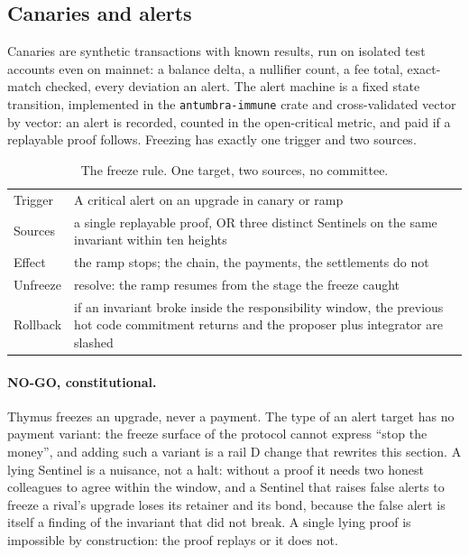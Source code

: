 \subsection{Canaries and alerts}

Canaries are synthetic transactions with known results, run on
isolated test accounts even on mainnet: a balance delta, a
nullifier count, a fee total, exact-match checked, every
deviation an alert. The alert machine is a fixed state transition,
implemented in the \texttt{antumbra-immune} crate and
cross-validated vector by vector: an alert is recorded, counted
in the open-critical metric, and paid if a replayable proof
follows. Freezing has exactly one trigger and two sources.

\begin{table}[htbp]
\centering
\small
\caption{The freeze rule. One target, two sources, no committee.}
\label{tab:freeze}
\begin{tabularx}{\textwidth}{@{}L{4.6cm}Y@{}}
\toprule
Trigger & A critical alert on an upgrade in canary or ramp \\
Sources & a single replayable proof, OR three distinct Sentinels on the same invariant within ten heights \\
Effect & the ramp stops; the chain, the payments, the settlements do not \\
Unfreeze & resolve: the ramp resumes from the stage the freeze caught \\
Rollback & if an invariant broke inside the responsibility window, the previous hot code commitment returns and the proposer plus integrator are slashed \\
\bottomrule
\end{tabularx}
\end{table}

\paragraph{NO-GO, constitutional.} Thymus freezes an upgrade,
never a payment. The type of an alert target has no payment
variant: the freeze surface of the protocol cannot express
``stop the money'', and adding such a variant is a rail D change
that rewrites this section. A lying Sentinel is a nuisance, not a
halt: without a proof it needs two honest colleagues to agree
within the window, and a Sentinel that raises false alerts to
freeze a rival's upgrade loses its retainer and its bond, because
the false alert is itself a finding of the invariant that did not
break. A single lying proof is impossible by construction: the
proof replays or it does not.

